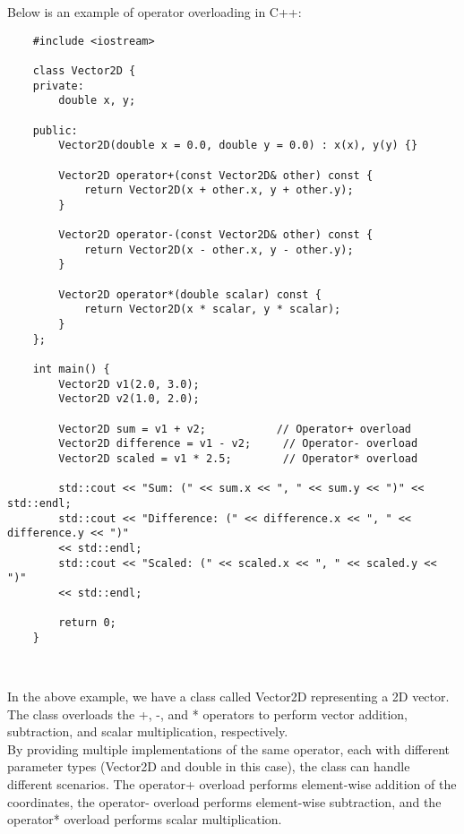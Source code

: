 \begin{solution}
    Below is an example of operator overloading in C++: \\
    \horizontalline
    \begin{verbatim}
    #include <iostream>
    
    class Vector2D {
    private:
        double x, y;
    
    public:
        Vector2D(double x = 0.0, double y = 0.0) : x(x), y(y) {}
    
        Vector2D operator+(const Vector2D& other) const {
            return Vector2D(x + other.x, y + other.y);
        }
    
        Vector2D operator-(const Vector2D& other) const {
            return Vector2D(x - other.x, y - other.y);
        }
    
        Vector2D operator*(double scalar) const {
            return Vector2D(x * scalar, y * scalar);
        }
    };
    
    int main() {
        Vector2D v1(2.0, 3.0);
        Vector2D v2(1.0, 2.0);
    
        Vector2D sum = v1 + v2;           // Operator+ overload
        Vector2D difference = v1 - v2;     // Operator- overload
        Vector2D scaled = v1 * 2.5;        // Operator* overload
    
        std::cout << "Sum: (" << sum.x << ", " << sum.y << ")" << std::endl;
        std::cout << "Difference: (" << difference.x << ", " << difference.y << ")" 
        << std::endl;
        std::cout << "Scaled: (" << scaled.x << ", " << scaled.y << ")" 
        << std::endl;
    
        return 0;
    }
    \end{verbatim} \\
    \horizontalline

    In the above example, we have a class called Vector2D representing a 2D vector. The class overloads the +, -, and * operators to perform vector addition, subtraction, and scalar multiplication, respectively. \\

    \noindent By providing multiple implementations of the same operator, each with different parameter types (Vector2D and double in this case), the class can handle different scenarios. The operator+ overload performs element-wise addition of the coordinates, the operator- overload performs element-wise subtraction, 
    and the operator* overload performs scalar multiplication. \\


\end{solution}
